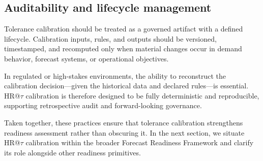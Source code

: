 \subsection{Auditability and lifecycle management}
\label{subsec:auditability}

Tolerance calibration should be treated as a governed artifact with a defined
lifecycle.
Calibration inputs, rules, and outputs should be versioned, timestamped, and
recomputed only when material changes occur in demand behavior, forecast systems,
or operational objectives.

In regulated or high-stakes environments, the ability to reconstruct the
calibration decision—given the historical data and declared rules—is essential.
HR@$\tau$ calibration is therefore designed to be fully deterministic and
reproducible, supporting retrospective audit and forward-looking governance.

Taken together, these practices ensure that tolerance calibration strengthens
readiness assessment rather than obscuring it.
In the next section, we situate HR@$\tau$ calibration within the broader
Forecast Readiness Framework and clarify its role alongside other readiness
primitives.
